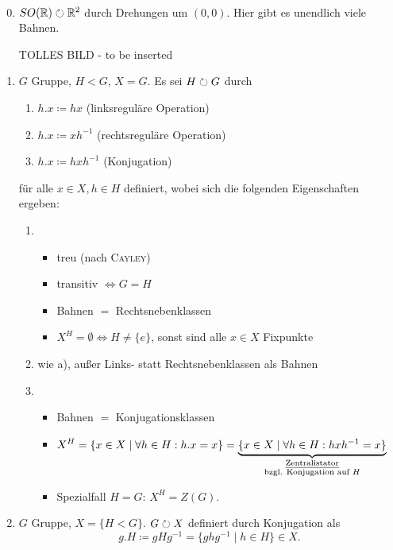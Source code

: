 \documentclass[12pt,a4paper]{scrartcl}
\begin{document}
\begin{bsp}~
	\begin{enumerate}
		\setcounter{enumi}{-1}
		\item $SO(\mathbb R) \circlearrowright \mathbb R^2$ durch Drehungen um $(0,0)$. Hier gibt es unendlich viele Bahnen.
		\begin{center}
			TOLLES BILD -  to be inserted
		\end{center}
		\item $G$ Gruppe, $H<G$, $X = G$. Es sei $H \circlearrowright G$ durch
		\begin{enumerate}[label=\alph*)]
			\item $h.x\coloneqq hx$ (linksreguläre Operation)
			\item $h.x\coloneqq xh^{-1}$ (rechtsreguläre Operation)
			\item $h.x\coloneqq hxh^{-1}$ (Konjugation)
		\end{enumerate}
		für alle $x\in X, h \in H$ definiert, wobei sich die folgenden Eigenschaften ergeben:
		\begin{enumerate}[label=\alph*)]
			\item \begin{itemize}[itemsep=-3pt]
				\item treu (nach \textsc{Cayley})
				\item transitiv $\Leftrightarrow G = H$
				\item Bahnen $=$ Rechtsnebenklassen
				\item $X^H = \emptyset \Leftrightarrow H \neq \{e\}$, sonst sind alle $x \in X$ Fixpunkte
			\end{itemize}
			\item wie a), außer Links- statt Rechtsnebenklassen als Bahnen
			\item \begin{itemize}[itemsep=-3pt]
				\item Bahnen $=$ Konjugationsklassen
				\item ${\displaystyle X^H = \{x \in X \mid \forall h \in H: h.x = x \} = \underbrace{\{x \in X \mid \forall h \in H: hxh^{-1} = x \}}_{\substack{\text{\emph{Zentralistator}}\\\text{bzgl. Konjugation auf }H}}}$
				\item Spezialfall $H=G$: $X^H = Z(G)$.
			\end{itemize}
		\end{enumerate}
		\item $G$ Gruppe, $X = \{H < G \}$. $G \circlearrowright X$ definiert durch Konjugation als \[ g.H \coloneqq gHg^{-1} = \{ ghg^{-1} \mid h \in H \} \in X. \]

\end{enumerate}
\end{bsp}
\end{document}
